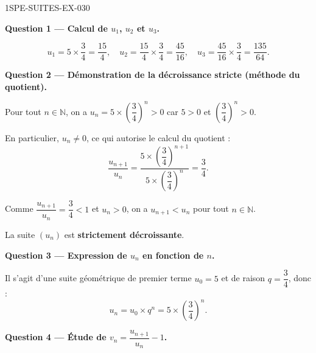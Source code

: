 \begin{corrige}{1SPE-SUITES-EX-030}

\textbf{Question 1 — Calcul de $u_1$, $u_2$ et $u_3$.}

\[
  u_1 = 5 \times \frac{3}{4} = \frac{15}{4}, \quad u_2 = \frac{15}{4} \times \frac{3}{4} = \frac{45}{16}, \quad u_3 = \frac{45}{16} \times \frac{3}{4} = \frac{135}{64}.
\]

\medskip
\textbf{Question 2 — Démonstration de la décroissance stricte (méthode du quotient).}

Pour tout $n \in \mathbb{N}$, on a $u_n = 5 \times \left(\dfrac{3}{4}\right)^n > 0$ car $5 > 0$ et $\left(\dfrac{3}{4}\right)^n > 0$.

En particulier, $u_n
\neq 0$, ce qui autorise le calcul du quotient :
\[
  \frac{u_{n+1}}{u_n} = \frac{5 \times \left(\dfrac{3}{4}\right)^{n+1}}{5 \times \left(\dfrac{3}{4}\right)^n} = \frac{3}{4}.
\]


Comme $\dfrac{u_{n+1}}{u_n} = \dfrac{3}{4} < 1$ et $u_n > 0$, on a $u_{n+1} < u_n$ pour tout $n \in \mathbb{N}$.

La suite $(u_n)$ est \textbf{strictement décroissante}.

\medskip
\textbf{Question 3 — Expression de $u_n$ en fonction de $n$.}

Il s'agit d'une suite géométrique de premier terme $u_0 = 5$ et de raison $q = \dfrac{3}{4}$, donc :
\[
  u_n = u_0 \times q^n = 5 \times \left(\frac{3}{4}\right)^n.
\]

\medskip
\textbf{Question 4 — Étude de $v_n = \dfrac{u_{n+1}}{u_n} - 1$.}


\end{corrige}
